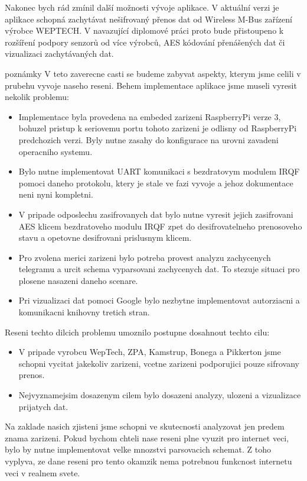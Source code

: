 Nakonec bych rád zmínil další možnosti vývoje aplikace. V aktuální verzi je aplikace schopná zachytávat nešifrovaný přenos dat od Wireless M-Bus zařízení výrobce WEPTECH. V navazující diplomové práci proto bude přistoupeno k rozšíření podpory senzorů od více výrobců, AES kódování přenášených dat či vizualizaci zachytávaných dat.



\colorbox[rgb]{0,1,0}{poznámky}
V teto zaverecne casti se budeme zabyvat aspekty, kterym jsme celili v prubehu vyvoje naseho reseni. 
Behem implementace aplikace jsme museli vyresit nekolik problemu:
\begin{itemize}
	\item Implementace byla provedena na embeded zarizeni RaspberryPi verze 3, bohuzel pristup k seriovemu portu tohoto zarizeni je odlisny od RaspberryPi predchozich verzi. Byly nutne zasahy do konfigurace na urovni zavadeni operacniho systemu.
	\item Bylo nutne implementovat UART komunikaci s bezdratovym modulem IRQF pomoci daneho protokolu, ktery je stale ve fazi vyvoje a jehoz dokumentace neni nyni kompletni.
	\item V pripade odposlechu zasifrovanych dat bylo nutne vyresit jejich zasifrovani AES klicem bezdratoveho modulu IRQF zpet do desifrovatelneho prenosoveho stavu a opetovne desifrovani prislusnym klicem.
	\item Pro zvolena merici zarizeni bylo potreba provest analyzu zachycenych telegramu a urcit schema vyparsovani zachycenych dat. To stezuje situaci pro plosene nasazeni daneho scenare.
	\item Pri vizualizaci dat pomoci Google bylo nezbytne implementovat autorziacni a komunikacni knihovny tretich stran.
\end{itemize}
Reseni techto dilcich problemu umoznilo postupne dosahnout techto cilu:
\begin{itemize}
	\item V pripade vyrobcu WepTech, ZPA, Kamstrup, Bonega a Pikkerton jsme schopni vycitat jakekoliv zarizeni, vcetne zarizeni podporujici pouze sifrovany prenos.	
	\item Nejvyznamejsim dosazenym cilem bylo dosazeni analyzy, ulozeni a vizualizace prijatych dat.
\end{itemize}

Na zaklade nasich zjisteni jsme schopni ve skutecnosti analyzovat jen predem znama zarizeni. Pokud bychom chteli nase reseni plne vyuzit pro internet veci, bylo by nutne implementovat velke mnozstvi parsovacich schemat. Z toho vyplyva, ze dane reseni pro tento okamzik nema potrebnou funkcnost internetu veci v realnem svete.


